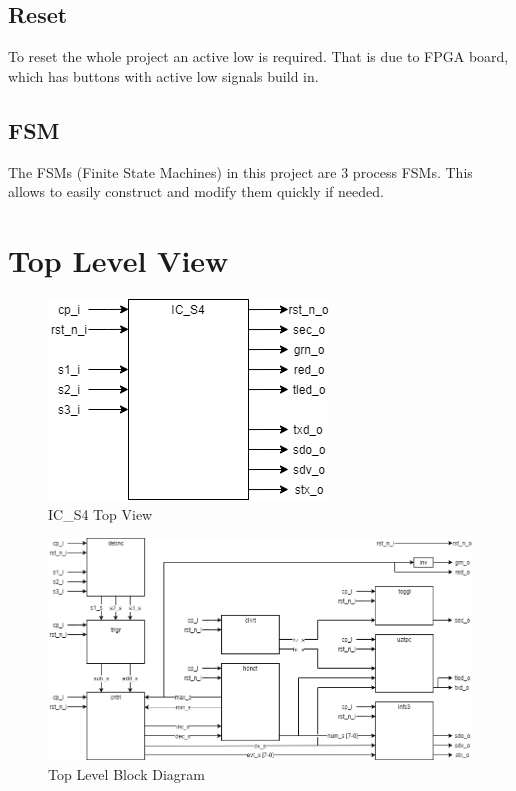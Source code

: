 \documentclass[12pt,a4 paper] {report}
\begin{document}
\section*{Reset}
To reset the whole project an active low is required. That is due to FPGA board, which has buttons with active low signals build in.
\section*{FSM}
The FSMs (Finite State Machines) in this project are 3 process FSMs. This allows to easily construct and modify them quickly if needed.

\newpage

\chapter{Top Level View}
\begin{figure}[h]
	\centering
	\includegraphics[scale=0.6]{../png/top.png}
	\caption{IC\_S4 Top View}
\end{figure}
\begin{figure}[h]
	\centering
	\includegraphics[scale=0.4]{../png/top-level.png}
	\caption{Top Level Block Diagram}
\end{figure}
\end{document}
